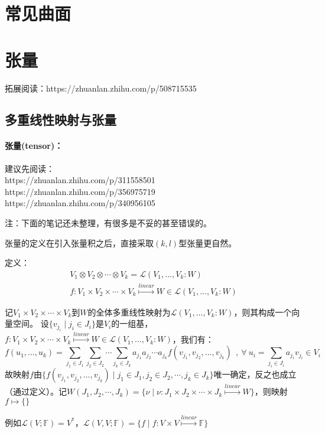 \documentclass[zihao=-4,UTF8]{report}
\def\F{\mathbb{F}}
\theoremstyle{mystyle} %
\begin{document}
\chapter{常见曲面}
\chapter{张量}

拓展阅读：https://zhuanlan.zhihu.com/p/508715535

\section{多重线性映射与张量}

\subsubsection{张量(tensor)：}
建议先阅读：\\ 
https://zhuanlan.zhihu.com/p/311558501\\
https://zhuanlan.zhihu.com/p/356975719\\ 
https://zhuanlan.zhihu.com/p/340956105\par
{\color{red}注：下面的笔记还未整理，有很多是不妥的甚至错误的。}
{\par\color{gray}\small
张量的定义在引入张量积之后，直接采取$(k,l)$型张量更自然。
\par}

定义：\begin{gather*}
    V_1\otimes V_2\otimes \cdots \otimes V_k  =  \mathscr{L}(V_1,...,V_k:W)\\
    f:V_1\times V_2\times \cdots \times V_k \overset{linear}{\longmapsto }W \in \mathscr{L}(V_1,...,V_k:W)
\end{gather*}  
{\par\color{gray}\small
记$V_1\times V_2\times \cdots \times V_k$到$W$的全体多重线性映射为$\mathscr{L}(V_1,...,V_k:W)$，则其构成一个向量空间。 设$\{v_{j_i}\mid j_i \in J_i\}$是$V_i$的一组基，$f:V_1\times V_2\times \cdots \times V_k \overset{linear}{\longmapsto }W \in \mathscr{L}(V_1,...,V_k:W)$，我们有：
\begin{equation*}
    f(u_1,...,u_k)=\sum_{j_1\in J_1}\sum_{j_2\in J_2}\cdots \sum_{j_k\in J_k}a_{j_1}a_{j_2}\cdots a_{j_k}f(v_{j_1},v_{j_2},...,v_{j_k})\ \ ,\   \forall\  u_i=\sum_{j_i \in J_i}a_{j_i}v_{j_i}\in V_i
\end{equation*}
故映射$f$由$\{f(v_{j_1},v_{j_2},...,v_{j_k})\mid j_1\in J_1,j_2\in J_2,\cdots,j_k\in J_k\}$唯一确定，反之也成立（通过定义）。记$W(J_1,J_2,\cdots,J_k) = \{\nu \mid \nu: J_1\times J_2\times \cdots \times J_k \overset{linear}{\longmapsto} W\}$，则映射$f\longmapsto \{\}$
\par}
{\par\color{gray}\small
例如$\mathscr{L}(V;\F)=V^*$，$\mathscr{L}(V,V;\F) = \{f\mid f:V \times V \overset{linear}{\longmapsto} \F\}$
\par}
\end{document}
